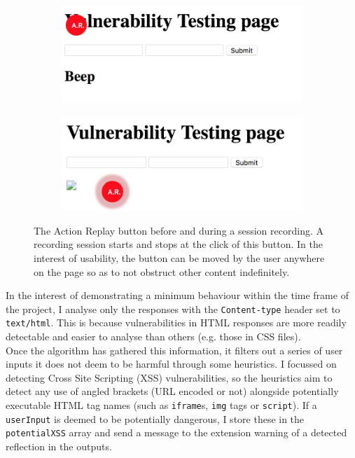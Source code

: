 \begin{figure}[h]
	\centering
	\begin{subfigure}{.5\textwidth}
		\centering
		\includegraphics[width=.8\linewidth]{images/ar_initial.png}
		\label{fig:test_page_investigate_form}
	\end{subfigure}%
	\begin{subfigure}{.5\textwidth}
		\centering
		\includegraphics[width=.8\linewidth]{images/ar_recording.png}
		\label{fig:whiteBox}
	\end{subfigure}
	\caption{The Action Replay button before and during a session recording. A recording session starts and stops at the click of this button. In the interest of usability, the button can be moved by the user anywhere on the page so as to not obstruct other content indefinitely.}
	\label{fig:test}
\end{figure} 

In the interest of demonstrating a minimum behaviour within the time frame of the project, I analyse only the responses with the \texttt{Content-type} header set to \texttt{text/html}. This is because vulnerabilities in HTML responses are more readily detectable and easier to analyse than others (e.g. those in CSS files). \\

Once the algorithm has gathered this information, it filters out a series of user inputs it does not deem to be harmful through some heuristics. I focussed on detecting Cross Site Scripting (XSS) vulnerabilities, so the heuristics aim to detect any use of angled brackets (URL encoded or not) alongside potentially executable HTML tag names (such as \texttt{iframe}s, \texttt{img} tags or \texttt{script}). If a \texttt{userInput} is deemed to be potentially dangerous, I store these in the \texttt{potentialXSS} array and send a message to the extension warning of a detected reflection in the outputs. \\

